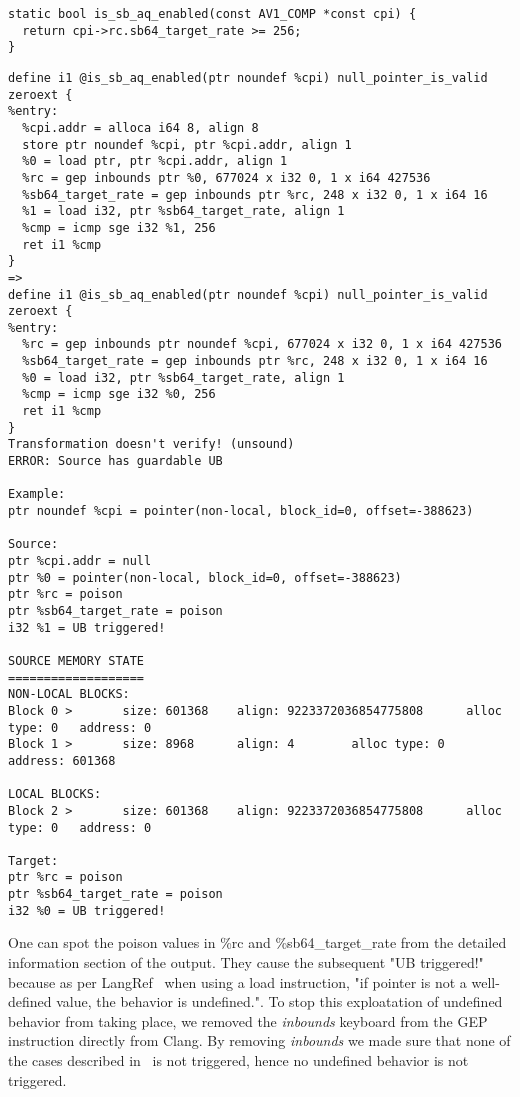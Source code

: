 \begin{lstlisting}[style=Cstyle, caption={C code for is_sb_aq_enabled}, label={lst:is_sb_aq_enabled_c_code}]
static bool is_sb_aq_enabled(const AV1_COMP *const cpi) {
  return cpi->rc.sb64_target_rate >= 256;
}
\end{lstlisting}

\begin{lstlisting}[caption={Alive2 output on is_sb_aq_enabled}, label={lst:is_sb_aq_enabled_alive}]
define i1 @is_sb_aq_enabled(ptr noundef %cpi) null_pointer_is_valid zeroext {
%entry:
  %cpi.addr = alloca i64 8, align 8
  store ptr noundef %cpi, ptr %cpi.addr, align 1
  %0 = load ptr, ptr %cpi.addr, align 1
  %rc = gep inbounds ptr %0, 677024 x i32 0, 1 x i64 427536
  %sb64_target_rate = gep inbounds ptr %rc, 248 x i32 0, 1 x i64 16
  %1 = load i32, ptr %sb64_target_rate, align 1
  %cmp = icmp sge i32 %1, 256
  ret i1 %cmp
}
=>
define i1 @is_sb_aq_enabled(ptr noundef %cpi) null_pointer_is_valid zeroext {
%entry:
  %rc = gep inbounds ptr noundef %cpi, 677024 x i32 0, 1 x i64 427536
  %sb64_target_rate = gep inbounds ptr %rc, 248 x i32 0, 1 x i64 16
  %0 = load i32, ptr %sb64_target_rate, align 1
  %cmp = icmp sge i32 %0, 256
  ret i1 %cmp
}
Transformation doesn't verify! (unsound)
ERROR: Source has guardable UB

Example:
ptr noundef %cpi = pointer(non-local, block_id=0, offset=-388623)

Source:
ptr %cpi.addr = null
ptr %0 = pointer(non-local, block_id=0, offset=-388623)
ptr %rc = poison
ptr %sb64_target_rate = poison
i32 %1 = UB triggered!

SOURCE MEMORY STATE
===================
NON-LOCAL BLOCKS:
Block 0 >       size: 601368    align: 9223372036854775808      alloc type: 0   address: 0
Block 1 >       size: 8968      align: 4        alloc type: 0   address: 601368

LOCAL BLOCKS:
Block 2 >       size: 601368    align: 9223372036854775808      alloc type: 0   address: 0

Target:
ptr %rc = poison
ptr %sb64_target_rate = poison
i32 %0 = UB triggered!
\end{lstlisting}

One can spot the poison values in \%rc and \%sb64_target_rate from the detailed
information section of the output. They cause the subsequent "UB triggered!"
because as per
LangRef~\cite{load-semantics} when using a load instruction, "if pointer is not a
well-defined value, the behavior is undefined.". To stop this exploatation of
undefined behavior from taking place, we removed the \textit{inbounds} keyboard
from the GEP instruction directly from Clang. By removing \textit{inbounds} we
made sure that none of the cases described in~\cite{getelementptr-semantics} is
not triggered, hence no undefined behavior is not triggered.

